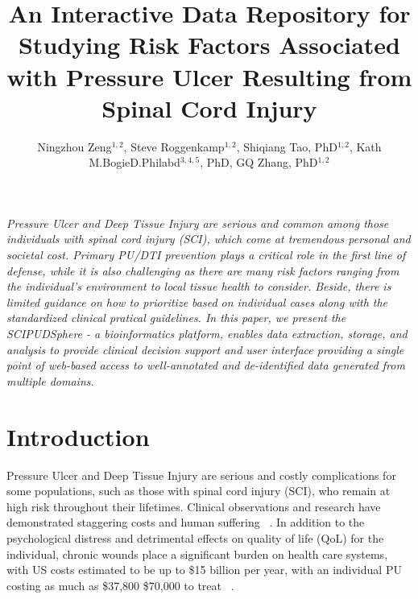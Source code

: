 \documentclass{amia}
\begin{document}
\title{An Interactive Data Repository for Studying Risk Factors Associated with Pressure Ulcer Resulting from Spinal Cord Injury}

\author{Ningzhou Zeng$^{1,2}$, Steve Roggenkamp$^{1,2}$, Shiqiang Tao, PhD$^{1,2}$, Kath M.BogieD.Philabd$^{3,4,5}$, PhD, GQ Zhang, PhD$^{1,2}$}


\maketitle


\textit{Pressure Ulcer and Deep Tissue Injury are serious and common among those individuals with spinal cord injury (SCI), which come at tremendous personal and societal cost. Primary PU/DTI prevention plays a critical role in the first line of defense, while it is also challenging as there are many risk factors ranging from the individual’s environment to local tissue health to consider. Beside, there is limited guidance on how to prioritize based on individual cases along with the standardized clinical pratical guidelines. In this paper, we present the SCIPUDSphere - a bioinformatics platform, enables data extraction, storage, and analysis to provide clinical decision support and user interface providing a single point of web-based access to well-annotated and de-identified data generated from multiple domains. }

\section{Introduction}
Pressure Ulcer and Deep Tissue Injury are serious and costly complications for some populations, such as those with spinal cord injury (SCI), who remain at high risk throughout their lifetimes. Clinical observations and research have demonstrated staggering costs and human suffering ~\cite{ref1,ref2,ref3}. In addition to the psychological distress and detrimental effects on quality of life (QoL) for the individual, chronic wounds place a significant burden on health care systems, with US costs estimated to be up to \$15 billion per year, with an individual PU costing as much as \$37,800 \- \$70,000 to treat  ~\cite{ref4,ref5,ref6}.
\end{document}
